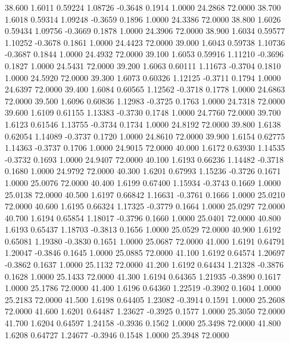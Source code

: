   38.600   1.6011   0.59224   1.08726  -0.3648   0.1914   1.0000  24.2868  72.0000
  38.700   1.6018   0.59314   1.09248  -0.3659   0.1896   1.0000  24.3386  72.0000
  38.800   1.6026   0.59434   1.09756  -0.3669   0.1878   1.0000  24.3906  72.0000
  38.900   1.6034   0.59577   1.10252  -0.3678   0.1861   1.0000  24.4423  72.0000
  39.000   1.6043   0.59738   1.10736  -0.3687   0.1844   1.0000  24.4932  72.0000
  39.100   1.6053   0.59916   1.11210  -0.3696   0.1827   1.0000  24.5431  72.0000
  39.200   1.6063   0.60111   1.11673  -0.3704   0.1810   1.0000  24.5920  72.0000
  39.300   1.6073   0.60326   1.12125  -0.3711   0.1794   1.0000  24.6397  72.0000
  39.400   1.6084   0.60565   1.12562  -0.3718   0.1778   1.0000  24.6863  72.0000
  39.500   1.6096   0.60836   1.12983  -0.3725   0.1763   1.0000  24.7318  72.0000
  39.600   1.6109   0.61155   1.13383  -0.3730   0.1748   1.0000  24.7760  72.0000
  39.700   1.6123   0.61546   1.13755  -0.3734   0.1734   1.0000  24.8192  72.0000
  39.800   1.6138   0.62054   1.14089  -0.3737   0.1720   1.0000  24.8610  72.0000
  39.900   1.6154   0.62775   1.14363  -0.3737   0.1706   1.0000  24.9015  72.0000
  40.000   1.6172   0.63930   1.14535  -0.3732   0.1693   1.0000  24.9407  72.0000
  40.100   1.6193   0.66236   1.14482  -0.3718   0.1680   1.0000  24.9792  72.0000
  40.300   1.6201   0.67993   1.15236  -0.3726   0.1671   1.0000  25.0076  72.0000
  40.400   1.6199   0.67400   1.15934  -0.3743   0.1669   1.0000  25.0138  72.0000
  40.500   1.6197   0.66842   1.16631  -0.3761   0.1666   1.0000  25.0210  72.0000
  40.600   1.6195   0.66324   1.17325  -0.3779   0.1664   1.0000  25.0297  72.0000
  40.700   1.6194   0.65854   1.18017  -0.3796   0.1660   1.0000  25.0401  72.0000
  40.800   1.6193   0.65437   1.18703  -0.3813   0.1656   1.0000  25.0529  72.0000
  40.900   1.6192   0.65081   1.19380  -0.3830   0.1651   1.0000  25.0687  72.0000
  41.000   1.6191   0.64791   1.20047  -0.3846   0.1645   1.0000  25.0885  72.0000
  41.100   1.6192   0.64574   1.20697  -0.3862   0.1637   1.0000  25.1132  72.0000
  41.200   1.6192   0.64434   1.21328  -0.3876   0.1628   1.0000  25.1433  72.0000
  41.300   1.6194   0.64365   1.21935  -0.3890   0.1617   1.0000  25.1786  72.0000
  41.400   1.6196   0.64360   1.22519  -0.3902   0.1604   1.0000  25.2183  72.0000
  41.500   1.6198   0.64405   1.23082  -0.3914   0.1591   1.0000  25.2608  72.0000
  41.600   1.6201   0.64487   1.23627  -0.3925   0.1577   1.0000  25.3050  72.0000
  41.700   1.6204   0.64597   1.24158  -0.3936   0.1562   1.0000  25.3498  72.0000
  41.800   1.6208   0.64727   1.24677  -0.3946   0.1548   1.0000  25.3948  72.0000
